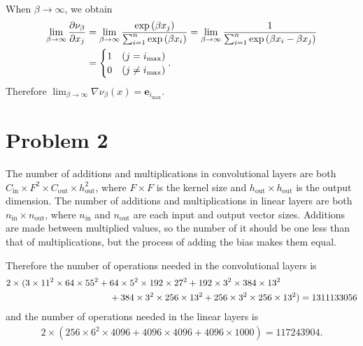 \documentclass[10pt]{article}
\begin{document}
\begin{enumerate}[(a)]
\begin{align*}
    \end{align*}
    When $\beta \to \infty$, we obtain 
    \begin{align*}
        \lim_{\beta \to \infty}\frac{\partial\nu_\beta}{\partial x_j} &= \lim_{\beta \to \infty}\frac{\exp\qty(\beta x_j)}{\sum_{i=1}^{n}\exp\qty(\beta x_i)} = \lim_{\beta \to \infty}\frac{1}{\sum_{i=1}^{n}\exp\qty(\beta x_i - \beta x_j)} \\
        &= \begin{cases}
            1 & \qty(j = i_{\max}) \\
            0 & \qty(j \neq i_{\max})
        \end{cases}.
    \end{align*}
    Therefore $\displaystyle \lim_{\beta \to \infty}\nabla\nu_\beta(x) = \mathbf{e}_{i_{\max}}$.
\end{enumerate}

\section*{Problem 2}
The number of additions and multiplications in convolutional layers are both $C_{\mathrm{in}} \times F^2 \times C_{\mathrm{out}} \times h_{\mathrm{out}}^2$, where $F \times F$ is the kernel size and $h_{\mathrm{out}} \times h_{\mathrm{out}}$ is the output dimension.
The number of additions and multiplications in linear layers are both $n_{\mathrm{in}} \times n_{\mathrm{out}}$, where $n_{\mathrm{in}}$ and $n_{\mathrm{out}}$ are each input and output vector sizes.
Additions are made between multiplied values, so the number of it should be one less than that of multiplications, but the process of adding the bias makes them equal.

\vspace{3mm}
Therefore the number of operations needed in the convolutional layers is
\begin{align*}
    &2 \times (3 \times 11^2 \times 64 \times 55^2 + 64 \times 5^2 \times 192 \times 27^2 + 192 \times 3^2 \times 384 \times 13^2 \\ 
    &\hspace*{4cm} + 384 \times 3^2 \times 256 \times 13^2 + 256 \times 3^2 \times 256 \times 13^2) = 1311133056
\end{align*}
and the number of operations needed in the linear layers is
\begin{align*}
    2 \times (256 \times 6^2 \times 4096 + 4096 \times 4096 + 4096 \times 1000) = 117243904.
\end{align*}
\end{document}
